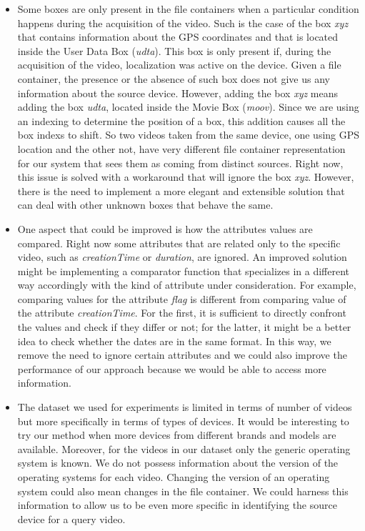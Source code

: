 \begin{itemize}

\item Some boxes are only present in the file containers when a particular condition happens during the acquisition of the video. Such is the case of the box \emph{xyz} that contains information about the GPS coordinates and that is located inside the User Data Box (\emph{udta}). This box is only present if, during the acquisition of the video, localization was active on the device. Given a file container, the presence or the absence of such box does not give us any information about the source device. However, adding the box \emph{xyz} means adding the box \emph{udta}, located inside the Movie Box (\emph{moov}). Since we are using an indexing to determine the position of a box, this addition causes all the box indexs to shift. So two videos taken from the same device, one using GPS location and the other not, have very different file container representation for our system that sees them as coming from distinct sources. Right now, this issue is solved with a workaround that will ignore the box \emph{xyz}. However, there is the need to implement a more elegant and extensible solution that can deal with other unknown boxes that behave the same.

\item One aspect that could be improved is how the attributes values are compared. Right now some attributes that are related only to the specific video, such as \emph{creationTime} or \emph{duration}, are ignored. An improved solution might be implementing a comparator function that specializes in a different way accordingly with the kind of attribute under consideration. For example, comparing values for the attribute \emph{flag} is different from comparing value of the attribute \emph{creationTime}. For the first, it is sufficient to directly confront the values and check if they differ or not; for the latter, it might be a better idea to check whether the dates are in the same format. In this way, we remove the need to ignore certain attributes and we could also improve the performance of our approach because we would be able to access more information.

\item The dataset we used for experiments is limited in terms of number of videos but more specifically in terms of types of devices. It would be interesting to try our method when more devices from different brands and models are available. Moreover, for the videos in our dataset only the generic operating system is known. We do not possess information about the version of the operating systems for each video. Changing the version of an operating system could also mean changes in the file container. We could harness this information to allow us to be even more specific in identifying the source device for a query video.


\end{itemize}
